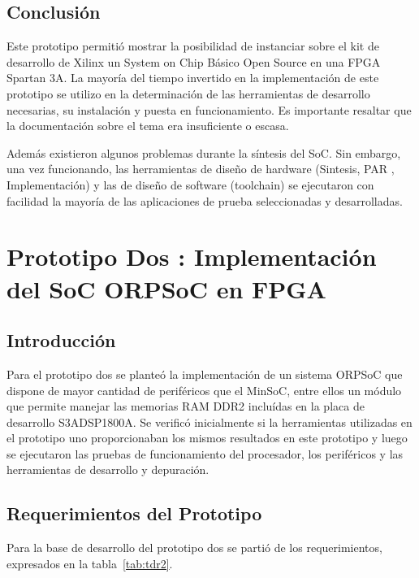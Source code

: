 		\section{Conclusión}
		Este prototipo permitió mostrar la posibilidad de instanciar sobre el kit de desarrollo de Xilinx un System on Chip Básico Open Source en una FPGA
		Spartan 3A. La mayoría del tiempo invertido en la implementación de este prototipo se utilizo en la determinación de las herramientas de
		desarrollo necesarias, su instalación y puesta en funcionamiento. Es importante resaltar que la documentación sobre el tema era insuficiente o
		escasa. 
		
		Además existieron algunos problemas durante la síntesis del SoC. Sin embargo, una vez funcionando, las herramientas de diseño de hardware (Sintesis,
		PAR , Implementación) y las de diseño de software (toolchain) se ejecutaron con facilidad la mayoría de las aplicaciones de prueba seleccionadas y
		desarrolladas.
		
\newpage		
\chapter{Prototipo Dos : Implementación del SoC ORPSoC en FPGA}
		\section{Introducción}

		Para el prototipo dos se planteó la implementación de un sistema ORPSoC que dispone de mayor cantidad de periféricos que el MinSoC, entre ellos un
		módulo que permite manejar las memorias RAM DDR2 incluídas en la placa de desarrollo S3ADSP1800A. Se verificó inicialmente si la herramientas
		utilizadas en el prototipo uno proporcionaban los mismos resultados en este prototipo y luego se ejecutaron las pruebas de funcionamiento del
		procesador, los periféricos y las herramientas de desarrollo y depuración. 
		
		\section{Requerimientos del Prototipo}
Para la base de desarrollo del prototipo dos se partió de los requerimientos, expresados en la tabla~\ref{tab:tdr2}.


